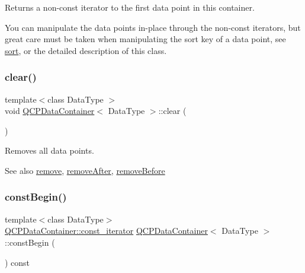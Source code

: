 Returns a non-\/const iterator to the first data point in this container.

You can manipulate the data points in-\/place through the non-\/const iterators, but great care must be taken when manipulating the sort key of a data point, see \mbox{\hyperlink{class_q_c_p_data_container_a75da92e33063b63d6da5014683591d45}{sort}}, or the detailed description of this class. \mbox{\label{class_q_c_p_data_container_a7e2b29736c6fd761649bda1a54ba967f}} 
\subsubsection{\texorpdfstring{clear()}{clear()}}
{\footnotesize\ttfamily template$<$class Data\+Type $>$ \\
void \mbox{\hyperlink{class_q_c_p_data_container}{Q\+C\+P\+Data\+Container}}$<$ Data\+Type $>$\+::clear (\begin{DoxyParamCaption}{ }\end{DoxyParamCaption})}

Removes all data points.

\begin{DoxySeeAlso}{See also}
\mbox{\hyperlink{class_q_c_p_data_container_ae5f569a120648b167efa78835f12fd38}{remove}}, \mbox{\hyperlink{class_q_c_p_data_container_abbe5d87ffc10b5aeffa5bb42cf03aa3c}{remove\+After}}, \mbox{\hyperlink{class_q_c_p_data_container_aa7f74cbce304b0369e1626c3798e1eda}{remove\+Before}} 
\end{DoxySeeAlso}
\mbox{\label{class_q_c_p_data_container_a49d7622999e2de67fa2331626a3159aa}} 
\subsubsection{\texorpdfstring{constBegin()}{constBegin()}}
{\footnotesize\ttfamily template$<$class Data\+Type$>$ \\
\mbox{\hyperlink{class_q_c_p_data_container_ae40a91f5cb0bcac61d727427449b7d15}{Q\+C\+P\+Data\+Container\+::const\+\_\+iterator}} \mbox{\hyperlink{class_q_c_p_data_container}{Q\+C\+P\+Data\+Container}}$<$ Data\+Type $>$\+::const\+Begin (\begin{DoxyParamCaption}{ }\end{DoxyParamCaption}) const\hspace{0.3cm}{\ttfamily [inline]}}

